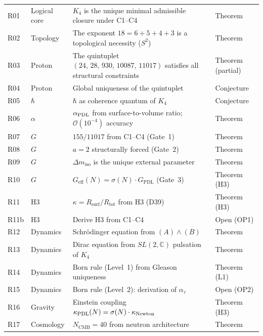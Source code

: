 \documentclass[11pt,a4paper]{article}
\theoremstyle{plain}
\theoremstyle{definition}
\theoremstyle{remark}
\newcommand{\PDL}{\textnormal{PDL}}
\newcommand{\Kfour}{K_4}
\newcommand{\quintuplet}{(24,\,28,\,930,\,10087,\,11017)}
\newcommand{\Geff}{G_{\mathrm{eff}}}
\newcommand{\GPDL}{G_{\mathrm{PDL}}}
\newcommand{\Rsurf}{R_{\mathrm{surf}}}
\newcommand{\Rtot}{R_{\mathrm{tot}}}
\newcommand{\sigmaN}{\sigma(N)}
\begin{document}
\begin{longtable}{@{}L{0.7cm}L{2.5cm}L{6.5cm}L{2.5cm}@{}}
R01 & Logical core & $\Kfour$ is the unique minimal admissible closure under C1--C4 & \textcolor{proofblue}{Theorem} \\[0.3em]
R02 & Topology & The exponent $18=6+5+4+3$ is a topological necessity ($S^2$) & \textcolor{proofblue}{Theorem} \\[0.3em]
R03 & Proton & The quintuplet $\quintuplet$ satisfies all structural constraints & \textcolor{proofblue}{Theorem (partial)} \\[0.3em]
R04 & Proton & Global uniqueness of the quintuplet & \textcolor{conjecturegreen}{Conjecture} \\[0.3em]
R05 & $\hbar$ & $\hbar$ as coherence quantum of $\Kfour$ & \textcolor{conjecturegreen}{Conjecture} \\[0.3em]
R06 & $\alpha$ & $\alpha_{\PDL}$ from surface-to-volume ratio; $\mathcal{O}(10^{-4})$ accuracy & \textcolor{proofblue}{Theorem} \\[0.3em]
R07 & $G$ & $155/11017$ from C1--C4 (Gate~1) & \textcolor{proofblue}{Theorem} \\[0.3em]
R08 & $G$ & $a=2$ structurally forced (Gate~2) & \textcolor{proofblue}{Theorem} \\[0.3em]
R09 & $G$ & $\Delta m_{\mathrm{iso}}$ is the unique external parameter & \textcolor{proofblue}{Theorem} \\[0.3em]
R10 & $G$ & $\Geff(N)=\sigmaN\cdot\GPDL$ (Gate~3) & \textcolor{proofblue}{Theorem (H3)} \\[0.3em]
R11 & H3 & $\kappa=\Rsurf/\Rtot$ from H3 (D39) & \textcolor{proofblue}{Theorem (H3)} \\[0.3em]
R11b & H3 & Derive H3 from C1--C4 & \textcolor{openproblemred}{Open (OP1)} \\[0.3em]
R12 & Dynamics & Schr\"odinger equation from $(A)\wedge(B)$ & \textcolor{proofblue}{Theorem} \\[0.3em]
R13 & Dynamics & Dirac equation from $SL(2,\mathbb{C})$ pulsation of $\Kfour$ & \textcolor{proofblue}{Theorem} \\[0.3em]
R14 & Dynamics & Born rule (Level~1) from Gleason uniqueness & \textcolor{proofblue}{Theorem (L1)} \\[0.3em]
R15 & Dynamics & Born rule (Level~2): derivation of $\alpha_\tau$ & \textcolor{openproblemred}{Open (OP2)} \\[0.3em]
R16 & Gravity & Einstein coupling $\kappa_{\PDL}(N)=\sigmaN\cdot\kappa_{\mathrm{Newton}}$ & \textcolor{proofblue}{Theorem (H3)} \\[0.3em]
R17 & Cosmology & $N_{\mathrm{CMB}}=40$ from neutron architecture & \textcolor{proofblue}{Theorem} \\[0.3em]

\end{longtable}
\end{document}
